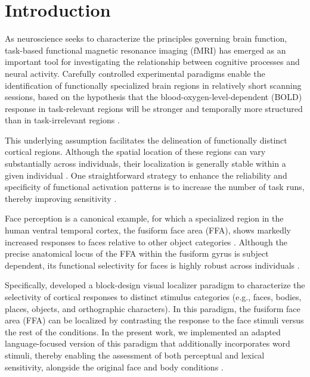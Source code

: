 \section{Introduction}
\label{sec:introtask} 



As neuroscience seeks to characterize the principles governing brain function, task-based functional magnetic resonance imaging (fMRI) has emerged as an important tool for investigating the relationship between cognitive processes and neural activity. Carefully controlled experimental paradigms enable the identification of functionally specialized brain regions in relatively short scanning sessions, based on the hypothesis that the blood-oxygen-level-dependent (BOLD) response in task-relevant regions will be stronger and temporally more structured than in task-irrelevant regions \citep{poldrackRegionInterestAnalysis2007, saxeDivideConquerDefense2006, gloverDeconvolutionImpulseResponse1999}.

This underlying assumption facilitates the delineation of functionally distinct cortical regions. Although the spatial location of these regions can vary substantially across individuals, their localization is generally stable within a given individual \citep{duboisBuildingScienceIndividual2016, fernandezIntrasubjectReproducibilityPresurgical2003, yoo2005long, cohenStabilityRepeatabilityExpression1999, grattonFunctionalBrainNetworks2018a}. One straightforward strategy to enhance the reliability and specificity of functional activation patterns is to increase the number of task runs, thereby improving sensitivity \citep{zandbeltSubjectVariationBOLDfMRI2008}.

Face perception is a canonical example, for which a specialized region in the human ventral temporal cortex, the fusiform face area (FFA), shows markedly increased responses to faces relative to other object categories \citep{kanwisherFusiformFaceArea1997}. Although the precise anatomical locus of the FFA within the fusiform gyrus is subject dependent, its functional selectivity for faces is highly robust across individuals \citep{bermanEvaluatingFunctionalLocalizers2010}. 

Specifically, \citet{stiglianiTemporalProcessingCapacity2015} developed a block-design visual localizer paradigm to characterize the selectivity of cortical responses to distinct stimulus categories (e.g., faces, bodies, places, objects, and orthographic characters). In this paradigm, the fusiform face area (FFA) can be localized by contrasting the response to the face stimuli versus the rest of the conditions. In the present work, we implemented an adapted language-focused version of this paradigm that additionally incorporates word stimuli, thereby enabling the assessment of both perceptual and lexical sensitivity, alongside the original face and body conditions \citep{lerma-usabiagaConvergingEvidenceFunctional2018,OHBM2026Tiger}.

